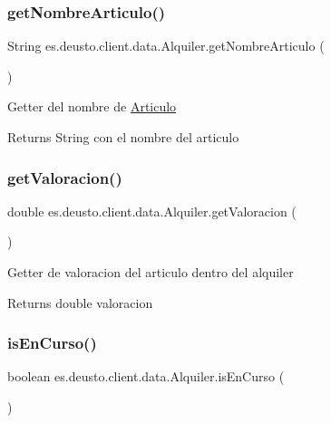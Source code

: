 \subsubsection{\texorpdfstring{getNombreArticulo()}{getNombreArticulo()}}
{\footnotesize\ttfamily String es.\+deusto.\+client.\+data.\+Alquiler.\+get\+Nombre\+Articulo (\begin{DoxyParamCaption}{ }\end{DoxyParamCaption})}

Getter del nombre de \mbox{\hyperlink{classes_1_1deusto_1_1client_1_1data_1_1_articulo}{Articulo}} \begin{DoxyReturn}{Returns}
String con el nombre del articulo 
\end{DoxyReturn}
\mbox{\label{classes_1_1deusto_1_1client_1_1data_1_1_alquiler_a8ca574c9dd9d490efb263f757354e072}} 
\subsubsection{\texorpdfstring{getValoracion()}{getValoracion()}}
{\footnotesize\ttfamily double es.\+deusto.\+client.\+data.\+Alquiler.\+get\+Valoracion (\begin{DoxyParamCaption}{ }\end{DoxyParamCaption})}

Getter de valoracion del articulo dentro del alquiler \begin{DoxyReturn}{Returns}
double valoracion 
\end{DoxyReturn}
\mbox{\label{classes_1_1deusto_1_1client_1_1data_1_1_alquiler_a2434d8d455e7606807226168efe55c35}} 
\subsubsection{\texorpdfstring{isEnCurso()}{isEnCurso()}}
{\footnotesize\ttfamily boolean es.\+deusto.\+client.\+data.\+Alquiler.\+is\+En\+Curso (\begin{DoxyParamCaption}{ }\end{DoxyParamCaption})}

